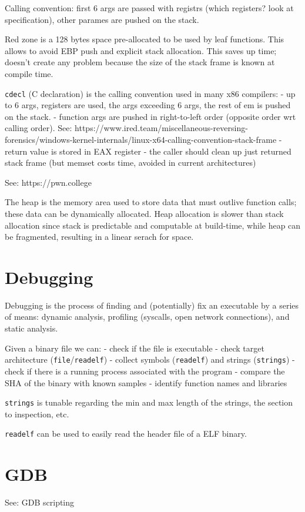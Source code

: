 Calling convention: first 6 args are passed with registrs (which registers? look at specification), other parames are pushed on the stack.

Red zone is a 128 bytes space pre-allocated to be used by leaf functions. This allows to avoid EBP push and explicit stack allocation.
This saves up time; doesn't create any problem because the size of the stack frame is known at compile time.

\texttt{cdecl} (C declaration) is the calling convention used in many x86 compilers:
- up to 6 args, registers are used, the args exceeding 6 args, the rest of em is pushed on the stack.
- function args are pushed in right-to-left order (opposite order wrt calling order). See: https://www.ired.team/miscellaneous-reversing-forensics/windows-kernel-internals/linux-x64-calling-convention-stack-frame
- return value is stored in EAX register
- the caller should clean up just returned stack frame (but memset costs time, avoided in current architectures)

See: https://pwn.college

The heap is the memory area used to store data that must outlive function calls; these data can be dynamically allocated.
Heap allocation is slower than stack allocation since stack is predictable and computable at build-time, while heap can be fragmented, resulting in a linear serach for space.

\section{Debugging}
Debugging is the process of finding and (potentially) fix an executable by a series of means: dynamic analysis, profiling (syscalls, open network connections), and static analysis.

Given a binary file we can:
 - check if the file is executable
 - check target architecture (\texttt{file}/\texttt{readelf})
 - collect symbols (\texttt{readelf}) and strings (\texttt{strings})
 - check if there is a running process associated with the program
 - compare the SHA of the binary with known samples
 - identify function names and libraries

\texttt{strings} is tunable regarding the min and max length of the strings, the section to inspection, etc.

\texttt{readelf} can be used to easily read the header file of a ELF binary. 

\section{GDB}
See: GDB scripting

